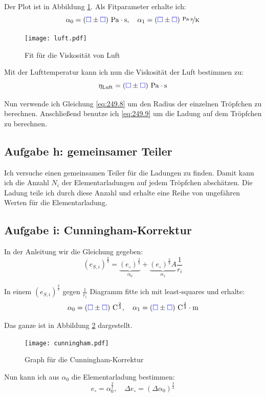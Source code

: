 \documentclass[11pt]{article}
\newcommand{\emesswert}{\left(\messwert \pm \messwert \right)}
\newcommand{\messwert}{\textcolor{blue}{\square}}
\begin{document}
Der Plot ist in Abbildung \ref{fig:luft.pdf}. Als Fitparameter erhalte ich:
\[
	\alpha_0 = \unit[\emesswert]{Pa \cdot s}
	, \quad
	\alpha_1 = \unitfrac[\emesswert]{Pa \cdot s}K
\]

\begin{figure}[h!]
	\centering
	\texttt{[image: luft.pdf]}
	\caption{Fit für die Viskosität von Luft}
	\label{fig:luft.pdf}
\end{figure}

Mit der Lufttemperatur kann ich nun die Viskosität der Luft bestimmen zu:
\[ \eta_\text{Luft} = \unit[\emesswert]{Pa \cdot s} \]

Nun verwende ich Gleichung \eqref{eq:249.8} um den Radius der einzelnen
Tröpfchen zu berechnen. Anschließend benutze ich \eqref{eq:249.9} um die Ladung
auf dem Tröpfchen zu berechnen.

\subsection{Aufgabe h: gemeinsamer Teiler}

Ich versuche einen gemeinsamen Teiler für die Ladungen zu finden. Damit kann
ich die Anzahl $N_i$ der Elementarladungen auf jedem Tröpfchen abschätzen. Die
Ladung teile ich durch diese Anzahl und erhalte eine Reihe von ungefähren
Werten für die Elementarladung.

\subsection{Aufgabe i: Cunningham-Korrektur}

In der Anleitung wir die Gleichung gegeben:
\[
	\left( e_{S, i} \right)^{\frac 23}
	= \underbrace{\left( e_\circ \right)^{\frac 23}}_{\alpha_0}
	+ \underbrace{\left( e_\circ \right)^{\frac 23} A}_{\alpha_1} \frac 1{r_i}
\]

In einem $\left( e_{S, i} \right)^{\frac 23}$ gegen $\frac 1{r_i}$ Diagramm
fitte ich mit least-squares und erhalte:
\[
	\alpha_0 = \unit[\emesswert]{C^{\frac 23}}
	, \quad
	\alpha_1 = \unit[\emesswert]{C^{\frac 23} \cdot m}
\]

Das ganze ist in Abbildung \ref{fig:cunningham} dargestellt.

\begin{figure}[h!]
	\centering
	\texttt{[image: cunningham.pdf]}
	\caption{Graph für die Cunningham-Korrektur}
	\label{fig:cunningham}
\end{figure}

Nun kann ich aus $\alpha_0$ die Elementarladung bestimmen:
\[
	e_\circ = \alpha_0^{\frac 32}
	, \quad
	\Delta e_\circ = (\Delta \alpha_0)^{\frac 32}
\]
\end{document}
